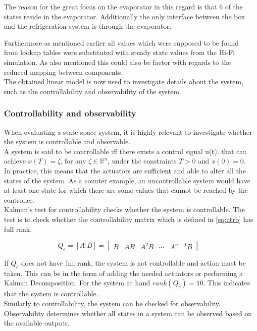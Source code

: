 The reason for the great focus on the evaporator in this regard is that 6 of the states reside in the evaporator. Additionally the only interface between the box and the refrigeration system is through the evaporator.

Furthermore as mentioned earlier all values which were supposed to be found from lookup tables were substituted with steady state values from the Hi-Fi simulation. As also mentioned this could also be factor with regards to the reduced mapping between components.\\

The obtained linear model is now used to investigate details about the system, such as the controllability and observability of the system.


\subsubsection{Controllability and observability}
When evaluating a state space system, it is highly relevant to investigate whether the system is controllable and observable. \\
A system is said to be controllable iff there exists a control signal u(t), that can achieve $x(T) = \zeta$, for any $\zeta \in \mathbb{R} ^{n}$, under the constraints $T>0$ and $x(0)=0$. In practice, this means that the actuators are sufficient and able to alter all the states of the system. As a counter example, an uncontrollable system would have at least one state for which there are some values that cannot be reached by the controller.\\
Kalman's test for controllability checks whether the system is controllable. The test is to check whether the controllability matrix which is defined in \cref{eq:ctrb} has full rank.

\begin{equation} \label{eq:ctrb}
	Q_c = [A|B] = \begin{bmatrix}  B & AB & A^2B & \cdots & A^{n-1}B  \end{bmatrix}
\end{equation}

If $Q_c$ does not have full rank, the system is not controllable and action must be taken. This can be in the form of adding the needed actuators or performing a Kalman Decomposition. For the system at hand $ rank(Q_c) = 10 $. This indicates that the system is controllable.\\

Similarly to controllability, the system can be checked for observability. Observability determines whether all states in a system can be observed based on the available outputs.

